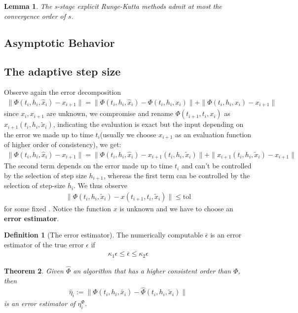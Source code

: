 \documentclass[a4paper,12pt,oneside,fleqn]{book}
\newtheorem{theorem}{Theorem}[section]
\newtheorem{lemma}[theorem]{Lemma}
\theoremstyle{definition}
\newtheorem{definition}{Definition}[section]
\theoremstyle{remark}
\begin{document}
\begin{lemma}
	The s-stage explicit Runge-Kutta methods admit at most the convergence order of $s$. 
\end{lemma}


\subsection{Asymptotic Behavior}


\subsection{The adaptive step size}
Observe again the error decomposition
\begin{align*}
	\|\Phi(t_i, h_i, \hat{x}_i ) - x_{i + 1}\| 
	= \|\Phi(t_i, h_i, \hat{x}_i ) - \Phi(t_i, h_i, x_i)\| 
	+ \| \Phi(t_i, h_i, x_i) - x_{i + 1}\|
\end{align*}
since $x_i, x_{i + 1}$ are unknown, we compromise and rename $\Phi(t_{i +1}, t_i, x_i)$ as $x_{i + 1}(t_i, h_i, \tilde{x}_i)$, indicating the evaluation is exact but the input depending on the error we made up to time $t_i$(usually we choose $x_{i+1}$ as an evaluation function of higher order of consistency), we get:
\begin{align*}
	\|\Phi(t_i, h_i, \hat{x}_i ) - x_{i + 1}\| 
	= \|\Phi(t_i, h_i, \hat{x}_i ) - x_{i + 1}(t_i, h_i, \tilde{x}_i)\| 
	+ \| x_{i + 1}(t_i, h_i, \tilde{x}_i) - x_{i + 1}\|	
\end{align*}
The second term depends on the error made up to time $t_i$ and can't be controlled by the selection of step size $h_{i + 1}$, whereas the first term can be controlled by the selection of step-size $h_i$. We thus observe
\begin{align*}
	 \|\Phi(t_i, h_i, \tilde{x}_i) - x(t_{i +1}, t_i, \tilde{x}_i)\| \le \text{tol}
\end{align*} 
for some fixed . Notice the function $x$ is unknown and we have to choose an \textbf{error estimator}. 

\begin{definition}[The error estimator]
	The numerically computable $\bar{\epsilon}$ is an error estimator of the true error $\epsilon$ if 
	\begin{align*}
		\kappa_1 \epsilon \le \bar{\epsilon} \le \kappa_2 \epsilon
	\end{align*}
\end{definition}

\begin{theorem}
	Given $\hat{\Phi}$ an algorithm that has a higher consistent order than $\Phi$, then 
	\begin{align*}
		\hat{\eta}_i := \| \Phi(t_i, h_i, \tilde{x_i}) - \hat{\Phi}(t_i, h_i, \tilde{x}_i)\|
	\end{align*}
	is an error estimator of $\eta^\Phi_i$.
\end{theorem}
\end{document}
